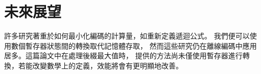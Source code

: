 \section{未來展望}
\label{sec:Future}

許多研究著重於如何最小化編碼的計算量，如重新定義遞迴公式。
我們便可以使用數個暫存器狀態間的轉換取代記憶體存取，
然而這些研究仍在離線編碼中應用居多。這篇論文中在處理後綴最大值時，
提供的方法尚未僅使用暫存器進行轉換，若能改變數學上的定義，效能將會有更明顯地改善。
